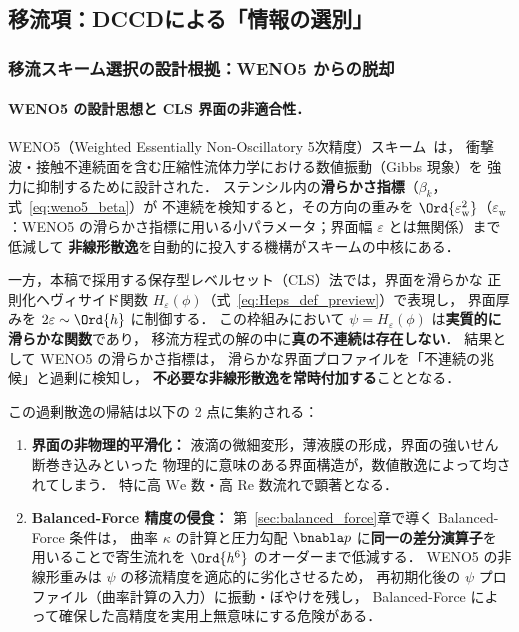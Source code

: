\subsection{移流項：DCCDによる「情報の選別」}
\label{sec:advection_motivation}

\subsubsection{移流スキーム選択の設計根拠：WENO5 からの脱却}
\label{sec:advection_weno5_critique}

\paragraph{WENO5 の設計思想と CLS 界面の非適合性．}
WENO5（Weighted Essentially Non-Oscillatory 5次精度）スキーム~\cite{JiangShu1996}は，
衝撃波・接触不連続面を含む圧縮性流体力学における数値振動（Gibbs 現象）を
強力に抑制するために設計された．
ステンシル内の\textbf{滑らかさ指標}（$\beta_k$，式~\eqref{eq:weno5_beta}）が
不連続を検知すると，その方向の重みを $\Ord{\varepsilon_{\mathrm{w}}^2}$（$\varepsilon_{\mathrm{w}}$：WENO5 の滑らかさ指標に用いる小パラメータ；界面幅 $\varepsilon$ とは無関係）まで低減して
\textbf{非線形散逸}を自動的に投入する機構がスキームの中核にある．

\medskip

一方，本稿で採用する保存型レベルセット（CLS）法では，界面を滑らかな
正則化ヘヴィサイド関数 $H_\varepsilon(\phi)$（式~\eqref{eq:Heps_def_preview}）で表現し，
界面厚みを $2\varepsilon \sim \Ord{h}$ に制御する．
この枠組みにおいて $\psi = H_\varepsilon(\phi)$ は\textbf{実質的に滑らかな関数}であり，
移流方程式の解の中に\textbf{真の不連続は存在しない}．
結果として WENO5 の滑らかさ指標は，
滑らかな界面プロファイルを「不連続の兆候」と過剰に検知し，
\textbf{不必要な非線形散逸を常時付加する}こととなる．

この過剰散逸の帰結は以下の 2 点に集約される：
\begin{enumerate}
  \item \textbf{界面の非物理的平滑化：}
        液滴の微細変形，薄液膜の形成，界面の強いせん断巻き込みといった
        物理的に意味のある界面構造が，数値散逸によって均されてしまう．
        特に高 $\mathrm{We}$ 数・高 $\mathrm{Re}$ 数流れで顕著となる．
  \item \textbf{Balanced-Force 精度の侵食：}
        第~\ref{sec:balanced_force}章で導く Balanced-Force 条件は，
        曲率 $\kappa$ の計算と圧力勾配 $\bnabla p$ に\textbf{同一の差分演算子}を
        用いることで寄生流れを $\Ord{h^6}$ のオーダーまで低減する．
        WENO5 の非線形重みは $\psi$ の移流精度を適応的に劣化させるため，
        再初期化後の $\psi$ プロファイル（曲率計算の入力）に振動・ぼやけを残し，
        Balanced-Force によって確保した高精度を実用上無意味にする危険がある．
\end{enumerate}


